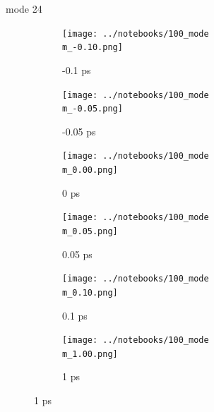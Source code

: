 \documentclass{beamer}
\begin{document}
\renewcommand\m{24}
\begin{frame}{mode \m}
	\begin{figure}
		\centering
		\begin{subfigure}[b]{\w\textwidth}
			\centering
			\texttt{[image: ../notebooks/100\_mode\\m\_-0.10.png]}
			\caption{-0.1 ps}
		\end{subfigure}
		\begin{subfigure}[b]{\w\textwidth}
			\centering
			\texttt{[image: ../notebooks/100\_mode\\m\_-0.05.png]}
			\caption{-0.05 ps}
		\end{subfigure}
		\begin{subfigure}[b]{\w\textwidth}
			\centering
			\texttt{[image: ../notebooks/100\_mode\\m\_0.00.png]}
			\caption{0 ps}
		\end{subfigure}
		\begin{subfigure}[b]{\w\textwidth}
			\centering
			\texttt{[image: ../notebooks/100\_mode\\m\_0.05.png]}
			\caption{0.05 ps}
		\end{subfigure}
		\begin{subfigure}[b]{\w\textwidth}
			\centering
			\texttt{[image: ../notebooks/100\_mode\\m\_0.10.png]}
			\caption{0.1 ps}
		\end{subfigure}
		\begin{subfigure}[b]{\w\textwidth}
			\centering
			\texttt{[image: ../notebooks/100\_mode\\m\_1.00.png]}
			\caption{1 ps}
		\end{subfigure}
	\end{figure}
\end{frame}
\end{document}
